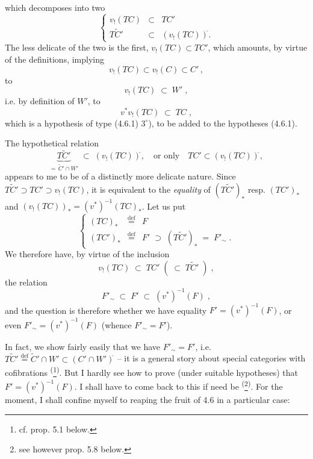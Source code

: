 \documentclass[11pt]{article}
\newcommand{\printedpage}[1]{\marginpar{\footnotesize p.~#1}}
\newcommand{\msp}[1]{\marginpar{\footnotesize [#1]}}
\newcommand{\defeq}{\overset{\text{def}}{=}}
\newcommand{\cl}{^{\tilde{}}}%
\begin{document}
\printedpage{39}
which decomposes into two
\[
\left\{
\begin{array}{rcl}
v_{!}(TC) & \subset & TC' \\
T\tilde{C}' & \subset & (v_{!}(TC))\cl.
\end{array}
\right.
\tag*{(4.7.3)}
\]
The less delicate of the two is the \msp{page 80} first, $v_{!}(TC) \subset TC'$, which amounts, by virtue of the definitions, implying
\[
v_{!}(TC) \subset v_{!}(C) \subset C' \, ,
\]
to
\[
v_{!}(TC) \;\subset\; W' \; ,
\]
i.e. by definition of $W'$, to
\[
v^{*}v_{!}(TC) \;\subset\; TC \; ,
\tag*{(4.7.4)}
\]
which is a hypothesis of type (4.6.1) $3^{\circ}$), to be added to the hypotheses (4.6.1).

The hypothetical relation
\[
\underbrace{T\tilde{C}'}_{=\,\tilde{C}'\cap W'} \;\subset\; (v_{!}(TC))\cl, \quad \text{or only} \quad TC' \subset (v_{!}(TC))\cl,
\tag*{$(*)$}
\]
appears to me to be of a distinctly more delicate nature. Since $T\tilde{C}' \supset TC' \supset v_{!}(TC)$, it is equivalent to the \textit{equality} of $(T\tilde{C}')_{*}$ resp. $(TC')_{*}$ and $(v_{!}(TC))_{*} = (v^{*})^{-1}(TC)_{*}$. Let us put
\[
\left\{
\begin{array}{lcl}
(TC)_{*} & \defeq & F \\
(TC')_{*} & \defeq & F' \;\supset\; (T\tilde{C}')_{*} \;=\; F'_{\sim} \; .
\end{array}
\right.
\tag*{(4.7.5)}
\]
We therefore have, by virtue of the inclusion
\[
v_{!}(TC) \;\subset\; TC' \; ( \;\subset\; T\tilde{C}' \; ) \; ,
\]
the relation
\[
F'_{\sim} \;\subset\; F' \;\subset\; (v^{*})^{-1}(F) \; ,
\tag*{(4.7.6)}
\]
and the question is therefore whether we have equality $F' = (v^{*})^{-1}(F)$, or even $F'_{\sim} = (v^{*})^{-1}(F)$ (whence $F'_{\sim} = F'$).

\msp{page 81}

In fact, we show fairly easily that we have $F'_{\sim} = F'$, i.e. $T\tilde{C}' \defeq \tilde{C}' \cap W' \subset (C' \cap W')\cl$ -- it is a general story about special categories with cofibrations \textsuperscript{(}\footnote[21]{cf. prop. 5.1 below.}\textsuperscript{)}. But I hardly see how to prove (under suitable hypotheses) that $F' = (v^{*})^{-1}(F)$. I shall have to come back to this if need be \textsuperscript{(}\footnote[22]{see however prop. 5.8 below.}\textsuperscript{)}. For the moment, I shall confine myself to reaping the fruit of 4.6 in a particular case:
\end{document}
